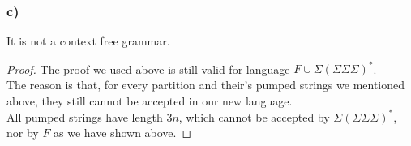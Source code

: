 \documentclass{article}
\begin{document}
\subsubsection{c)}
	It is not a context free grammar.
	\begin{proof}
		The proof we used above is still valid for language $F \cup \Sigma (\Sigma \Sigma \Sigma)^*$. \\
		The reason is that, for every partition and their's pumped strings we mentioned above, they still cannot be accepted in our new language. \\
		All pumped strings have length $3n$, which cannot be accepted by $\Sigma (\Sigma \Sigma \Sigma)^*$, nor by $F$ as we have shown above.
	\end{proof}
\end{document}
